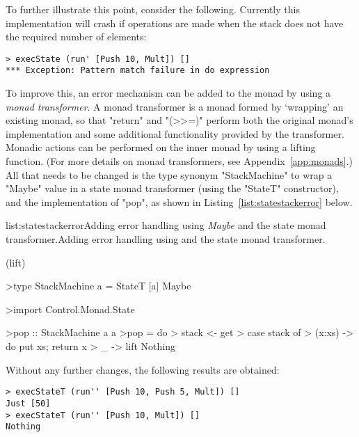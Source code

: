 To further illustrate this point, consider the following. Currently this implementation will crash if operations are made when the stack does not have the required number of elements:

\begin{verbatim}
> execState (run' [Push 10, Mult]) []
*** Exception: Pattern match failure in do expression
\end{verbatim}

\noindent To improve this, an error mechanism can be added to the monad by using a \emph{monad transformer}. A monad transformer is a monad formed by `wrapping' an existing monad, so that "return" and "(>>=)" perform both the original monad's implementation and some additional functionality provided by the transformer. Monadic actions can be performed on the inner monad by using a lifting function. (For more details on monad transformers, see Appendix~\ref{app:monads}.) All that needs to be changed is the type synonym "StackMachine" to wrap a "Maybe" value in a state monad transformer (using the "StateT" constructor), and the implementation of "pop", as shown in Listing~\ref{list:statestackerror} below.

\vspace{-0.5em}
\begin{listing}{list:statestackerror}{Adding error handling using \emph{Maybe} and the state monad transformer.}{Adding error handling using  and the state monad transformer.}{}
\end{listing}\vspace{-1.5em}

\functions(lift)
\begin{haskell}

>type StackMachine a = StateT [a] Maybe

>import Control.Monad.State

>pop :: StackMachine a a
>pop = do
>  stack <- get
>  case stack of
>    (x:xs) -> do put xs; return x
>    _ -> lift Nothing

\end{haskell}
\noindent Without any further changes, the following results are obtained:

\begin{verbatim}
> execStateT (run'' [Push 10, Push 5, Mult]) []
Just [50]
> execStateT (run'' [Push 10, Mult]) []
Nothing
\end{verbatim}

